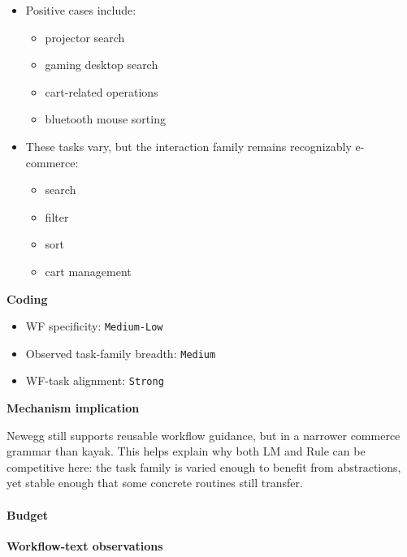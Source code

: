 \begin{itemize}
\tightlist
\item
  Positive cases include:

  \begin{itemize}
  \tightlist
  \item
    projector search
  \item
    gaming desktop search
  \item
    cart-related operations
  \item
    bluetooth mouse sorting
  \end{itemize}
\item
  These tasks vary, but the interaction family remains recognizably
  e-commerce:

  \begin{itemize}
  \tightlist
  \item
    search
  \item
    filter
  \item
    sort
  \item
    cart management
  \end{itemize}
\end{itemize}

\textbf{Coding}

\begin{itemize}
\tightlist
\item
  WF specificity: \texttt{Medium-Low}
\item
  Observed task-family breadth: \texttt{Medium}
\item
  WF-task alignment: \texttt{Strong}
\end{itemize}

\textbf{Mechanism implication}

Newegg still supports reusable workflow guidance, but in a narrower
commerce grammar than kayak. This helps explain why both LM and Rule can
be competitive here: the task family is varied enough to benefit from
abstractions, yet stable enough that some concrete routines still
transfer.

\paragraph{Budget}

\textbf{Workflow-text observations}

